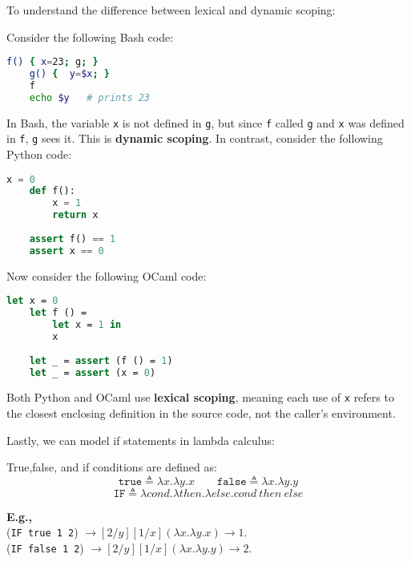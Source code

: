 \newpage 

\noindent
To understand the difference between lexical and dynamic scoping:

\begin{Example}

    \noindent
    Consider the following Bash code:
    
    \begin{lstlisting}[language=bash,numbers=none]
    f() { x=23; g; } 
    g() {  y=$x; }
    f
    echo $y   # prints 23
    \end{lstlisting}
    
    \noindent
    In Bash, the variable \texttt{x} is not defined in \texttt{g}, but since \texttt{f} called \texttt{g} and \texttt{x} was defined in \texttt{f}, \texttt{g} sees it. This is \textbf{dynamic scoping}.
    In contrast, consider the following Python code:

    \begin{lstlisting}[language=python,numbers=none]
    x = 0
    def f():
        x = 1
        return x
    
    assert f() == 1
    assert x == 0
    \end{lstlisting}
    
    \noindent
    Now consider the following OCaml code:
    \begin{lstlisting}[language=ML,numbers=none]
    let x = 0
    let f () = 
        let x = 1 in
        x
    
    let _ = assert (f () = 1)
    let _ = assert (x = 0)
    \end{lstlisting}
    
    \noindent
    Both Python and OCaml use \textbf{lexical scoping}, meaning each use of \texttt{x} refers to the closest enclosing definition in the source code, not the caller's environment.
\end{Example}

\noindent
Lastly, we can model if statements in lambda calculus:
\begin{theo}

    True,false, and if conditions are defined as:
    \Large
    \[
    \texttt{true} \triangleq \lambda x. \lambda y. x
    \quad\quad
    \texttt{false} \triangleq \lambda x. \lambda y. y
    \]
    \LARGE
    \[
    \texttt{IF} \triangleq \lambda cond. \lambda then. \lambda else. cond\ then\ else
    \]

    \normalsize
    \noindent
    \textbf{E.g.,}\\ 
    (\texttt{IF true 1 2}) $\to [2/y][1/x](\lambda x.\lambda y.x) \to 1$.\\
     (\texttt{IF false 1 2}) $\to [2/y][1/x](\lambda x.\lambda y.y) \to 2$.
\end{theo}